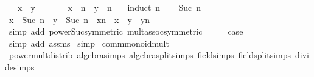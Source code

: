 \begin{isabellebody}
\ \ \ {\isachardoublequoteopen}x\ {\isacharasterisk}{\kern0pt}\ y\ {\isacharequal}{\kern0pt}\ {}{\isachardoublequoteclose}\isanewline
\ \ \ \ \ {\isachardoublequoteopen}x\ {\isacharcircum}{\kern0pt}\ n\ {\isacharasterisk}{\kern0pt}\ y\ {\isacharcircum}{\kern0pt}\ n\ {\isacharequal}{\kern0pt}\ {}{\isachardoublequoteclose}\isanewline
%
\isadelimproof
%
\endisadelimproof
%
\isatagproof
{}\isamarkupfalse%
\ {\isacharparenleft}{\kern0pt}induct\ n{\isacharparenright}{\kern0pt}\isanewline
\ \ \isamarkupfalse%
\ {\isacharparenleft}{\kern0pt}Suc\ n{\isacharparenright}{\kern0pt}\isanewline
\ \ \isamarkupfalse%
\ \isamarkupfalse%
\ {\isachardoublequoteopen}x\ {\isacharcircum}{\kern0pt}\ Suc\ n\ {\isacharasterisk}{\kern0pt}\ y\ {\isacharcircum}{\kern0pt}\ Suc\ n\ {\isacharequal}{\kern0pt}\ x{\isacharcircum}{\kern0pt}n\ {\isacharasterisk}{\kern0pt}\ {\isacharparenleft}{\kern0pt}x\ {\isacharasterisk}{\kern0pt}\ y{\isacharparenright}{\kern0pt}\ {\isacharasterisk}{\kern0pt}\ y{\isacharcircum}{\kern0pt}n{\isachardoublequoteclose}\isanewline
\ \ \ \ \isamarkupfalse%
\ {\isacharparenleft}{\kern0pt}simp\ add{\isacharcolon}{\kern0pt}\ power{\isacharunderscore}{\kern0pt}Suc{}{\isacharbrackleft}{\kern0pt}symmetric{\isacharbrackright}{\kern0pt}\ mult{\isachardot}{\kern0pt}assoc{\isacharbrackleft}{\kern0pt}symmetric{\isacharbrackright}{\kern0pt}{\isacharparenright}{\kern0pt}\isanewline
\ \ \isamarkupfalse%
\ \isamarkupfalse%
\ {\isacharquery}{\kern0pt}case\ \isamarkupfalse%
\ {\isacharparenleft}{\kern0pt}simp\ add{\isacharcolon}{\kern0pt}\ assms{\isacharparenright}{\kern0pt}\isanewline
{}\isamarkupfalse%
\ simp%
\endisatagproof
{\isafoldproof}%
%
\isadelimproof
\isanewline
%
\endisadelimproof
\isanewline
{}\isamarkupfalse%
\isanewline
\isanewline
{}\isamarkupfalse%
\ comm{\isacharunderscore}{\kern0pt}monoid{\isacharunderscore}{\kern0pt}mult\isanewline
{}\isanewline
\isanewline
{}\isamarkupfalse%
\ power{\isacharunderscore}{\kern0pt}mult{\isacharunderscore}{\kern0pt}distrib\ {\isacharbrackleft}{\kern0pt}algebra{\isacharunderscore}{\kern0pt}simps{\isacharcomma}{\kern0pt}\ algebra{\isacharunderscore}{\kern0pt}split{\isacharunderscore}{\kern0pt}simps{\isacharcomma}{\kern0pt}\ field{\isacharunderscore}{\kern0pt}simps{\isacharcomma}{\kern0pt}\ field{\isacharunderscore}{\kern0pt}split{\isacharunderscore}{\kern0pt}simps{\isacharcomma}{\kern0pt}\ divide{\isacharunderscore}{\kern0pt}simps{\isacharbrackright}{\kern0pt}{\isacharcolon}{\kern0pt}\isanewline

\end{isabellebody}
